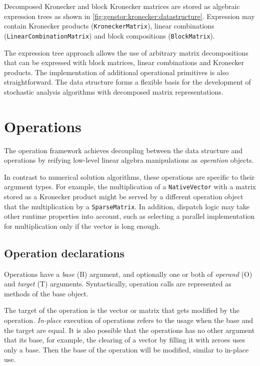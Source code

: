 Decomposed Kronecker and block Kronecker matrices are stored as
algebraic expression trees as shown in
\cref{fig:genstor:kronecker:datastructure}. Expression may contain
Kronecker products (\texttt{KroneckerMatrix}), linear combinations
(\texttt{LinearCombinationMatrix}) and block compositions
(\texttt{BlockMatrix}).

The expression tree approach allows the use of arbitrary matrix
decompositions that can be expressed with block matrices, linear
combinations and Kronecker products. The implementation of additional
operational primitives is also straightforward. The data structure
forms a flexible basis for the development of stochastic analysis
algorithms with decomposed matrix representations.

\section{Operations}

The operation framework achieves decoupling between the data structure
and operations by reifying low-level linear algebra manipulations as
\emph{operation} objects.

In contrast to numerical solution algorithms, these operations are
specific to their argument types. For example, the multiplication of a
\texttt{NativeVector} with a matrix stored as a Kronecker product
might be served by a different operation object that the
multiplication by a \texttt{SparseMatrix}. In addition, dispatch logic
may take other runtime properties into account, such as selecting a
parallel implementation for multiplication only if the vector is long
enough.

\subsection{Operation declarations}

Operations have a \emph{base} (B) argument, and optionally one or
both of \emph{operand} (O) and \emph{target} (T)
arguments. Syntactically, operation calls are represented as methods
of the base object.

The target of the operation is the vector or matrix that gets modified
by the operation. \emph{In-place} execution of operations refers to
the usage when the base and the target are equal. It is also possible
that the operations has no other argument that its base, for example,
the clearing of a vector by filling it with zeroes uses only a
base. Then the base of the operation will be modified, similar to
in-place use.

